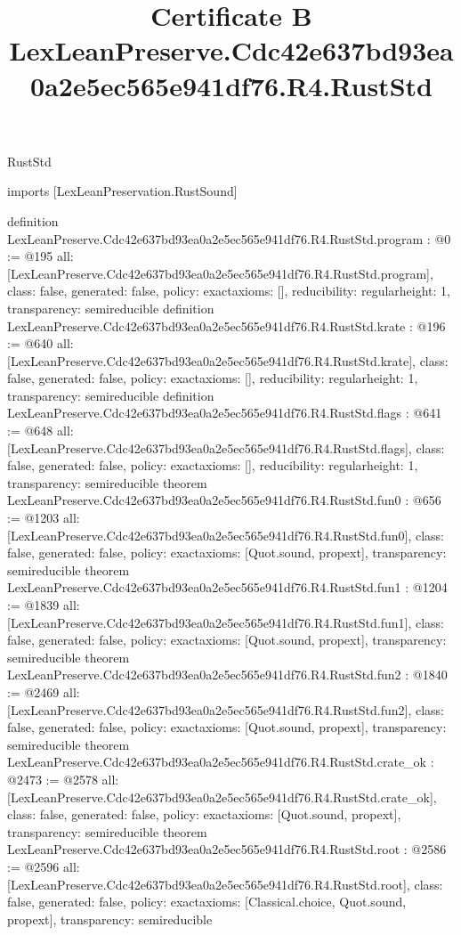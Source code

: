 \begin{lexlean}{RustStd}
\title{Certificate B LexLeanPreserve.Cdc42e637bd93ea0a2e5ec565e941df76.R4.RustStd}
\begin{coremodule}
imports [LexLeanPreservation.RustSound]

definition LexLeanPreserve.Cdc42e637bd93ea0a2e5ec565e941df76.R4.RustStd.program : @0 := @195 {
  all: [LexLeanPreserve.Cdc42e637bd93ea0a2e5ec565e941df76.R4.RustStd.program],
  class: false,
  generated: false,
  policy: exact{axioms: []},
  reducibility: regular{height: 1},
  transparency: semireducible
}
definition LexLeanPreserve.Cdc42e637bd93ea0a2e5ec565e941df76.R4.RustStd.krate : @196 := @640 {
  all: [LexLeanPreserve.Cdc42e637bd93ea0a2e5ec565e941df76.R4.RustStd.krate],
  class: false,
  generated: false,
  policy: exact{axioms: []},
  reducibility: regular{height: 1},
  transparency: semireducible
}
definition LexLeanPreserve.Cdc42e637bd93ea0a2e5ec565e941df76.R4.RustStd.flags : @641 := @648 {
  all: [LexLeanPreserve.Cdc42e637bd93ea0a2e5ec565e941df76.R4.RustStd.flags],
  class: false,
  generated: false,
  policy: exact{axioms: []},
  reducibility: regular{height: 1},
  transparency: semireducible
}
theorem LexLeanPreserve.Cdc42e637bd93ea0a2e5ec565e941df76.R4.RustStd.fun0 : @656 := @1203 {
  all: [LexLeanPreserve.Cdc42e637bd93ea0a2e5ec565e941df76.R4.RustStd.fun0],
  class: false,
  generated: false,
  policy: exact{axioms: [Quot.sound, propext]},
  transparency: semireducible
}
theorem LexLeanPreserve.Cdc42e637bd93ea0a2e5ec565e941df76.R4.RustStd.fun1 : @1204 := @1839 {
  all: [LexLeanPreserve.Cdc42e637bd93ea0a2e5ec565e941df76.R4.RustStd.fun1],
  class: false,
  generated: false,
  policy: exact{axioms: [Quot.sound, propext]},
  transparency: semireducible
}
theorem LexLeanPreserve.Cdc42e637bd93ea0a2e5ec565e941df76.R4.RustStd.fun2 : @1840 := @2469 {
  all: [LexLeanPreserve.Cdc42e637bd93ea0a2e5ec565e941df76.R4.RustStd.fun2],
  class: false,
  generated: false,
  policy: exact{axioms: [Quot.sound, propext]},
  transparency: semireducible
}
theorem LexLeanPreserve.Cdc42e637bd93ea0a2e5ec565e941df76.R4.RustStd.crate_ok : @2473 := @2578 {
  all: [LexLeanPreserve.Cdc42e637bd93ea0a2e5ec565e941df76.R4.RustStd.crate_ok],
  class: false,
  generated: false,
  policy: exact{axioms: [Quot.sound, propext]},
  transparency: semireducible
}
theorem LexLeanPreserve.Cdc42e637bd93ea0a2e5ec565e941df76.R4.RustStd.root : @2586 := @2596 {
  all: [LexLeanPreserve.Cdc42e637bd93ea0a2e5ec565e941df76.R4.RustStd.root],
  class: false,
  generated: false,
  policy: exact{axioms: [Classical.choice, Quot.sound, propext]},
  transparency: semireducible
}


\end{coremodule}
\end{lexlean}
